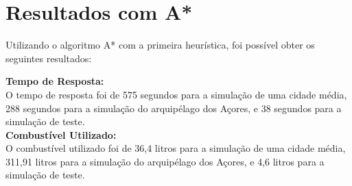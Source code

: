 \documentclass[a4paper,12pt]{scrreprt}
\begin{document}
\clearpage

\section{Resultados com A*}

Utilizando o algoritmo A* com a primeira heurística, foi possível obter os seguintes resultados:

\textbf{Tempo de Resposta:} \\
O tempo de resposta foi de 575 segundos para a simulação de uma cidade média, 288 segundos para a simulação
do arquipélago dos Açores, e 38 segundos para a simulação de teste. \\

\textbf{Combustível Utilizado:} \\
O combustível utilizado foi de 36,4 litros para a simulação de uma cidade média, 311,91 litros para a simulação
do arquipélago dos Açores, e 4,6 litros para a simulação de teste. \\

\clearpage
\end{document}
